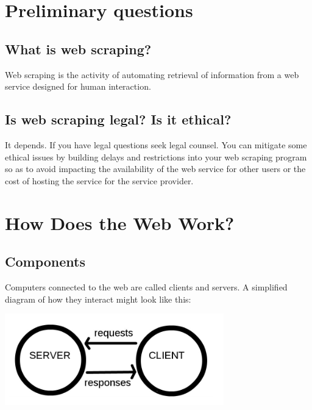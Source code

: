 \documentclass[]{book}
\begin{document}
\hypertarget{preliminary-questions}{%
\section{Preliminary questions}\label{preliminary-questions}}

\hypertarget{what-is-web-scraping}{%
\subsection{What is web scraping?}\label{what-is-web-scraping}}

Web scraping is the activity of automating retrieval of information
from a web service designed for human interaction.

\hypertarget{is-web-scraping-legal-is-it-ethical}{%
\subsection{Is web scraping legal? Is it ethical?}\label{is-web-scraping-legal-is-it-ethical}}

It depends. If you have legal questions seek legal counsel. You can
mitigate some ethical issues by building delays and restrictions into
your web scraping program so as to avoid impacting the availability of
the web service for other users or the cost of hosting the service for
the service provider.

\hypertarget{how-does-the-web-work}{%
\section{How Does the Web Work?}\label{how-does-the-web-work}}

\hypertarget{components}{%
\subsection{Components}\label{components}}

Computers connected to the web are called clients and servers. A simplified diagram of how they interact might look like this:

\includegraphics{Python/PythonWebScrape/images/client_server.png}
\end{document}
